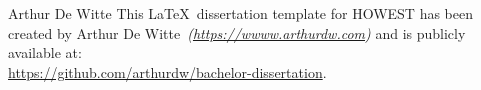 \documentclass[12pt,twoside]{report}
\begin{document}

\todototoc
\listoftodos


\emptypage


\thispagestyle{plain}
\emptypage


\thispagestyle{plain}
\emptypage

\tableofcontents
\thispagestyle{plain}
\emptypage

\newpage
{} 
\pagestyle{howest-section}





\printglossary[type=\acronymtype]
\printglossary



\def \templateauthor{Arthur De Witte} %
\ifx\thesisauthor\templateauthor
\else
    \normalsize
    This \LaTeX\ dissertation template for HOWEST has been created by \templateauthor\ \textit{(\url{https://wwww.arthurdw.com})} and is publicly available at: \\ \url{https://github.com/arthurdw/bachelor-dissertation}. \\
    \small
\fi
\printbibliography[heading=bib]

\appendix

\end{document}
